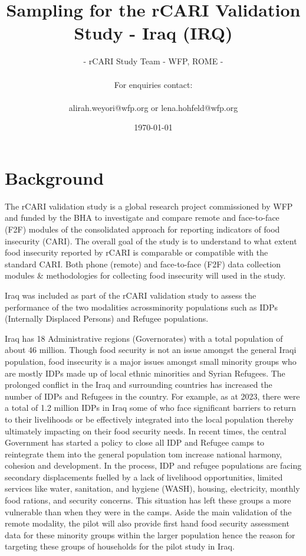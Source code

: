 \documentclass[11pt,harvard]{article}
\title{Sampling for the rCARI Validation Study - Iraq (IRQ)}
\author{- rCARI Study Team - WFP, ROME - 	\\	\\For enquiries contact:\\	\\alirah.weyori@wfp.org or lena.hohfeld@wfp.org}
\date{\today}
\begin{document}
	\maketitle \vspace{-2cm}
	\onehalfspacing
	\pagebreak
	\setlength{\parskip}{8pt} %
	
	\section{Background}
	
	The rCARI validation study is a global research project commissioned by WFP and funded by the BHA to investigate and compare remote and face-to-face (F2F) modules of the consolidated approach for reporting indicators of food insecurity (CARI). 
	The overall goal of the study is to understand to what extent food insecurity reported by rCARI is comparable or compatible with the standard CARI. Both phone (remote) and face-to-face (F2F) data collection modules \& methodologies for collecting food insecurity will used in the study.
	
	Iraq was included as part of the rCARI validation study to assess the performance of the two modalities acrossminority populations such as IDPs (Internally Displaced Persons) and Refugee populations. 
	
	Iraq has 18 Administrative regions (Governorates) with a total population of about 46 million. Though food security is not an issue amongst the general Iraqi population, food insecurity is a major issues amongst small minority groups who are mostly IDPs made up of local ethnic minorities and Syrian Refugees. The prolonged conflict in the Iraq and surrounding countries has increased the number of IDPs and Refugees in the country. For example, as at 2023, there were a total of 1.2 million IDPs in Iraq some of who face significant barriers to return to their livelihoods or be effectively integrated into the local population thereby ultimately impacting on their food security needs. In recent times, the central Government has started a policy to close all IDP and Refugee camps to reintegrate them into the general population tom increase national harmony, cohesion and development. In the process, IDP and refugee populations are facing secondary displacements fuelled by a lack of livelihood opportunities, limited services like water, sanitation, and hygiene (WASH), housing, electricity, monthly food rations, and security concerns. This situation has left these groups a more vulnerable than when they were in the camps. Aside the main validation of the remote modality, the pilot will also provide first hand food security assessment data for these minority groups within the larger population hence the reason for targeting these groups of households for the pilot study in Iraq. 
	  
\end{document}

